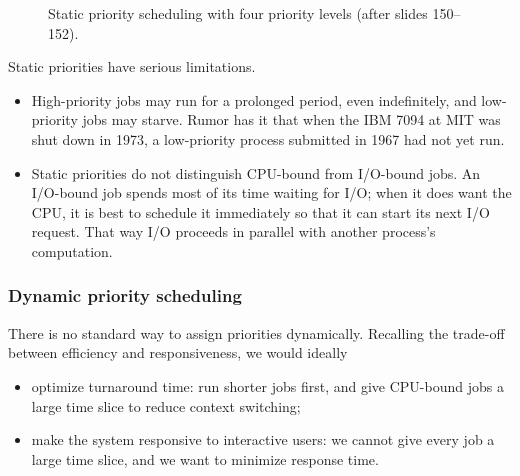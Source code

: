 \begin{figure}[htbp]
\centering
{}
\caption{Static priority scheduling with four priority levels (after slides 150--152).}
\label{fig:prio}
\end{figure}

Static priorities have serious limitations.
\begin{itemize}
  \item High-priority jobs may run for a prolonged period, even indefinitely, and low-priority jobs may starve. Rumor has it that when the IBM 7094 at MIT was shut down in 1973, a low-priority process submitted in 1967 had not yet run.
  \item Static priorities do not distinguish CPU-bound from I/O-bound jobs. An I/O-bound job spends most of its time waiting for I/O; when it does want the CPU, it is best to schedule it immediately so that it can start its next I/O request. That way I/O proceeds in parallel with another process's computation.
\end{itemize}

\subsubsection{Dynamic priority scheduling}
There is no standard way to assign priorities dynamically. Recalling the trade-off between efficiency and responsiveness, we would ideally
\begin{itemize}
  \item optimize turnaround time: run shorter jobs first, and give CPU-bound jobs a large time slice to reduce context switching;
  \item make the system responsive to interactive users: we cannot give every job a large time slice, and we want to minimize response time.
\end{itemize}

